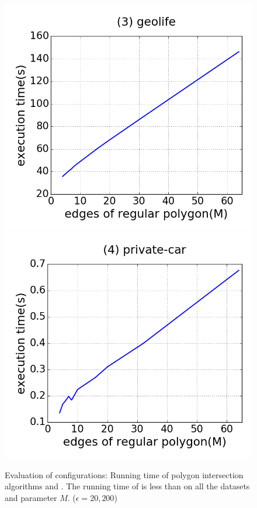 \begin{figure}[tb!]
\includegraphics[scale = 0.250]{figures/Exp-M-time-geolife.png}
\includegraphics[scale = 0.250]{figures/Exp-M-time-private.png}
\vspace{-2ex}
\caption{\small Evaluation of configurations: Running time of polygon intersection algorithms \rpia and \cpia. The running time of \rpia is less than \cpia on all the datasets and parameter $M$. ($\epsilon = 20, 200$)}
\label{fig:m-poly-time}
\vspace{-1ex}
\end{figure}

